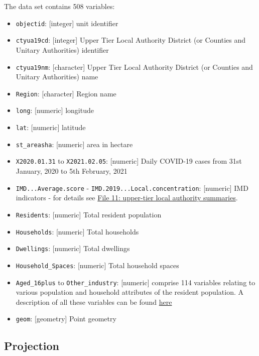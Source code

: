 \documentclass[
  letterpaper,
  krantz2]{style/krantz}
\providecommand{\tightlist}{%
  \setlength{\itemsep}{0pt}\setlength{\parskip}{0pt}}\usepackage{longtable,booktabs,array}
\begin{document}
The data set contains 508 variables:

\begin{itemize}
\tightlist
\item
  \texttt{objectid}: {[}integer{]} unit identifier
\item
  \texttt{ctyua19cd}: {[}integer{]} Upper Tier Local Authority District
  (or Counties and Unitary Authorities) identifier
\item
  \texttt{ctyua19nm}: {[}character{]} Upper Tier Local Authority
  District (or Counties and Unitary Authorities) name
\item
  \texttt{Region}: {[}character{]} Region name
\item
  \texttt{long}: {[}numeric{]} longitude
\item
  \texttt{lat}: {[}numeric{]} latitude
\item
  \texttt{st\_areasha}: {[}numeric{]} area in hectare
\item
  \texttt{X2020.01.31} to \texttt{X2021.02.05}: {[}numeric{]} Daily
  COVID-19 cases from 31st January, 2020 to 5th February, 2021
\item
  \texttt{IMD...Average.score} -
  \texttt{IMD.2019...Local.concentration}: {[}numeric{]} IMD indicators
  - for details see
  \href{https://www.gov.uk/government/statistics/english-indices-of-deprivation-2019}{File
  11: upper-tier local authority summaries}.
\item
  \texttt{Residents}: {[}numeric{]} Total resident population
\item
  \texttt{Households}: {[}numeric{]} Total households
\item
  \texttt{Dwellings}: {[}numeric{]} Total dwellings
\item
  \texttt{Household\_Spaces}: {[}numeric{]} Total household spaces
\item
  \texttt{Aged\_16plus} to \texttt{Other\_industry}: {[}numeric{]}
  comprise 114 variables relating to various population and household
  attributes of the resident population. A description of all these
  variables can be found
  \href{data/assignment_2_covid/census_vars.csv}{here}
\item
  \texttt{geom}: {[}geometry{]} Point geometry
\end{itemize}

\hypertarget{projection-1}{%
\subsection*{Projection}\label{projection-1}}
\end{document}
